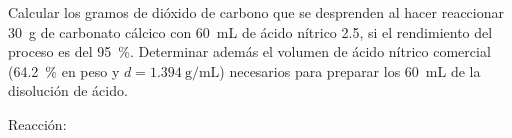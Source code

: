 Calcular los gramos de dióxido de carbono que se desprenden al hacer reaccionar \SI{30}{\gram} de carbonato cálcico con \SI{60}{\milli\liter} de ácido nítrico \SI{2,5}{\Molar}, si el rendimiento del proceso es del \SI{95}{\percent}. Determinar además el volumen de ácido nítrico comercial (\SI{64,2}{\percent} en peso y $d=\SI{1,394}{\gram\per\milli\liter}$) necesarios para preparar los \SI{60}{\milli\liter} de la disolución de ácido.
    
Reacción: 
